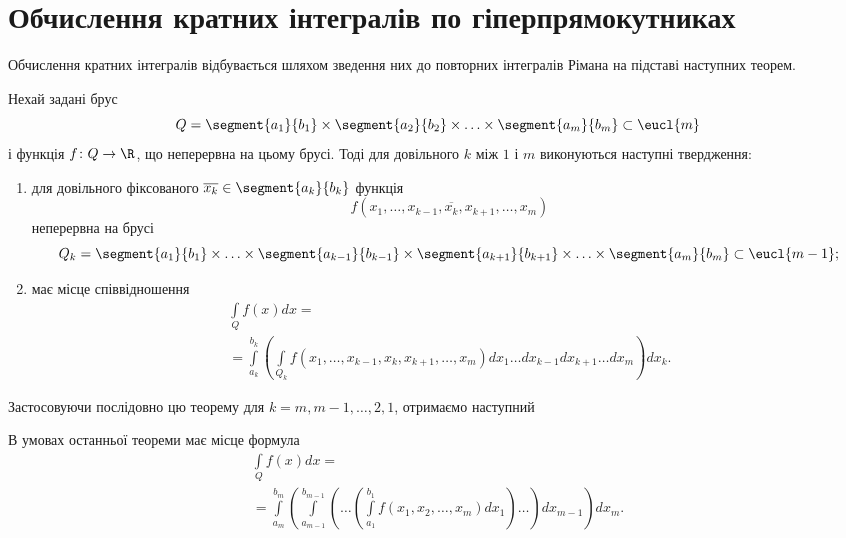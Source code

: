 \section{Обчислення кратних інтегралів по гіперпрямокутниках}
Обчислення кратних інтегралів відбувається шляхом зведення них до повторних інтегралів Рімана на підставі наступних теорем.
\begin{theorem}
Нехай задані брус
\[
Q = \segment{a_1}{b_1}\times\segment{a_2}{b_2}\times\ldots\times\segment{a_m}{b_m} \subset \eucl{m}
\]
і функція $f\colon Q\to \R$, що неперервна на цьому брусі. Тоді для довільного $k$ між $1$ і $m$ виконуються наступні твердження:
\begin{enumerate}[(1)]
\item для довільного фіксованого ${\overline{x_k} \in \segment{a_k}{b_k}}$ функція
\[
f\left(x_1, \ldots, x_{k-1}, \overline{x_k}, x_{k+1}, \ldots, x_m \right)
\]
неперервна на брусі
\[
Q_k = \segment{a_1}{b_1}\times\ldots\times\segment{a_{k-1}}{b_{k-1}}\times\segment{a_{k+1}}{b_{k+1}}\times\ldots\times\segment{a_m}{b_m} \subset \eucl{m-1};
\]
\item має місце співвідношення
\[
\begin{array}{lr}
\int\limits_Q f(x)d x = \\
=\int\limits_{a_k}^{b_k}\left(\int\limits_{Q_k}f\left(x_1, \ldots, x_{k-1}, x_k, x_{k+1}, \ldots, x_m \right)d x_1 \ldots d x_{k-1} d x_{k+1} \ldots d x_m\right)d x_k.
\end{array}
\]
\end{enumerate}
\end{theorem}
Застосовуючи послідовно цю теорему для ${k = m, m - 1, \ldots, 2, 1}$, отримаємо наступний
\begin{corollary}
В умовах останньої теореми має місце формула
\[
\begin{array}{lr}
\int\limits_Q f(x)d x = \\
=\int\limits_{a_{m}}^{b_{m}}\left(
\int\limits_{a_{m-1}}^{b_{m-1}}\left(
\ldots\left(
\int\limits_{a_1}^{b_1}
f\left(x_1, x_2, \ldots, x_m \right)
d x_1 \right)
\ldots\right)
d x_{m-1} \right)
d x_m .
\end{array}
\]
\end{corollary}
